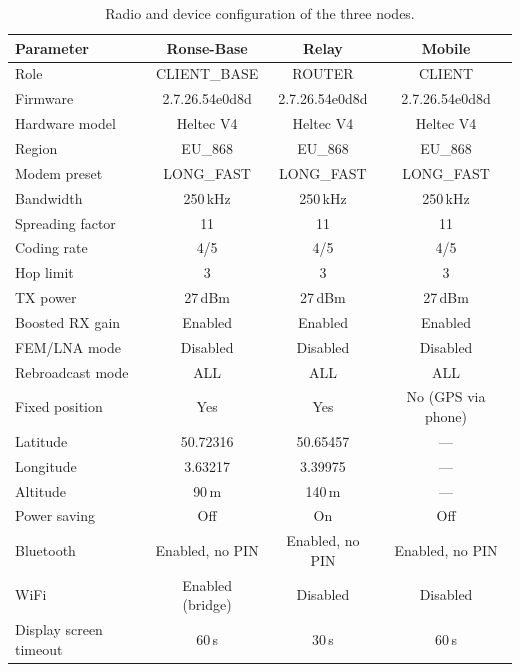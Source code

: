 \begin{table}[H]
  \centering
  \small
  \begin{tabular}{lccc}
    \toprule
    \textbf{Parameter} & \textbf{Ronse-Base} & \textbf{Relay} & \textbf{Mobile} \\
    \midrule
    Role                    & CLIENT\_BASE & ROUTER      & CLIENT \\
    Firmware                & 2.7.26.54e0d8d & 2.7.26.54e0d8d & 2.7.26.54e0d8d \\
    Hardware model          & Heltec V4    & Heltec V4   & Heltec V4 \\
    Region                  & EU\_868      & EU\_868     & EU\_868 \\
    Modem preset            & LONG\_FAST   & LONG\_FAST  & LONG\_FAST \\
    Bandwidth               & 250\,kHz     & 250\,kHz    & 250\,kHz \\
    Spreading factor        & 11           & 11          & 11 \\
    Coding rate             & 4/5          & 4/5         & 4/5 \\
    Hop limit               & 3            & 3           & 3 \\
    TX power                & 27\,dBm      & 27\,dBm     & 27\,dBm \\
    Boosted RX gain         & Enabled      & Enabled     & Enabled \\
    FEM/LNA mode            & Disabled     & Disabled    & Disabled \\
    Rebroadcast mode        & ALL          & ALL         & ALL \\
    \midrule
    Fixed position          & Yes          & Yes         & No (GPS via phone) \\
    Latitude                & 50.72316     & 50.65457    & --- \\
    Longitude               & 3.63217      & 3.39975     & --- \\
    Altitude                & 90\,m        & 140\,m      & --- \\
    \midrule
    Power saving            & Off          & On          & Off \\
    Bluetooth                & Enabled, no PIN & Enabled, no PIN & Enabled, no PIN \\
    WiFi                     & Enabled (bridge) & Disabled & Disabled \\
    Display screen timeout   & 60\,s        & 30\,s       & 60\,s \\
    \bottomrule
  \end{tabular}
  \caption[Radio and device configuration]{\label{tab:bijlage-config}Radio and device configuration of the three nodes.}
\end{table}

